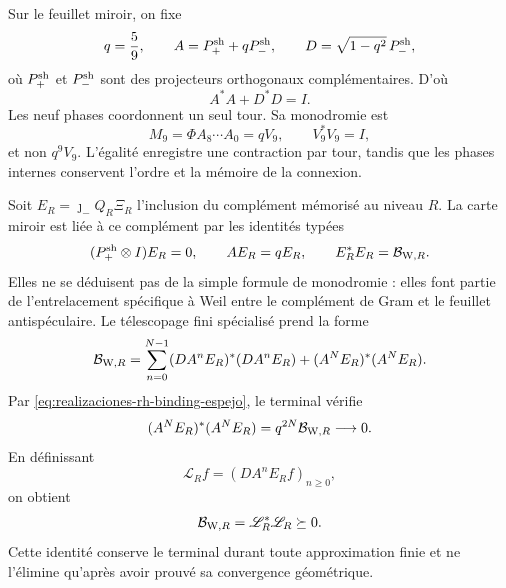 Sur le feuillet miroir, on fixe
\begin{equation}\label{eq:realizaciones-rh-q}
 q=\frac59,
 \qquad
 A=P_+^{\rm sh}+qP_-^{\rm sh},
 \qquad
 D=\sqrt{1-q^2}\,P_-^{\rm sh},
\end{equation}
où \(P_+^{\rm sh}\) et \(P_-^{\rm sh}\) sont des projecteurs orthogonaux
complémentaires. D'où
\begin{equation}\label{eq:realizaciones-rh-conservacion-local}
 A^*A+D^*D=I.
\end{equation}
Les neuf phases coordonnent un seul tour. Sa monodromie est
\begin{equation}\label{eq:realizaciones-rh-monodromia}
 M_9=\Phi A_8\cdots A_0=qV_9,
 \qquad V_9^*V_9=I,
\end{equation}
et non \(q^9V_9\). L'égalité enregistre une contraction par tour, tandis que
les phases internes conservent l'ordre et la mémoire de la connexion.

Soit \(E_R=\jmath_-Q_R\Xi_R\) l'inclusion du complément mémorisé au
niveau \(R\). La carte miroir est liée à ce complément par les
identités typées
\begin{equation}\label{eq:realizaciones-rh-binding-espejo}
 (P_+^{\rm sh}\otimes I)E_R=0,
 \qquad
 AE_R=qE_R,
 \qquad
 E_R^*E_R=\mathcal B_{{\rm W},R}.
\end{equation}
Elles ne se déduisent pas de la simple formule de monodromie : elles font partie de
l'entrelacement spécifique à Weil entre le complément de Gram et le feuillet
antispéculaire. Le télescopage fini spécialisé prend la forme
\begin{equation}\label{eq:realizaciones-rh-ref9}
 \mathcal B_{{\rm W},R}
 =\sum_{n=0}^{N-1}(DA^nE_R)^*(DA^nE_R)
 +(A^NE_R)^*(A^NE_R).
\end{equation}
Par \eqref{eq:realizaciones-rh-binding-espejo}, le terminal vérifie
\begin{equation}\label{eq:realizaciones-rh-terminal}
 (A^NE_R)^*(A^NE_R)
 =q^{2N}\mathcal B_{{\rm W},R}
 \longrightarrow0.
\end{equation}
En définissant
\begin{equation}\label{eq:realizaciones-rh-L}
 \mathscr L_R f=(DA^nE_Rf)_{n\geq0},
\end{equation}
on obtient
\begin{equation}\label{eq:realizaciones-rh-lstar-l}
 \mathcal B_{{\rm W},R}=\mathscr L_R^*\mathscr L_R\succeq0.
\end{equation}
Cette identité conserve le terminal durant toute approximation finie et ne
l'élimine qu'après avoir prouvé sa convergence géométrique.

